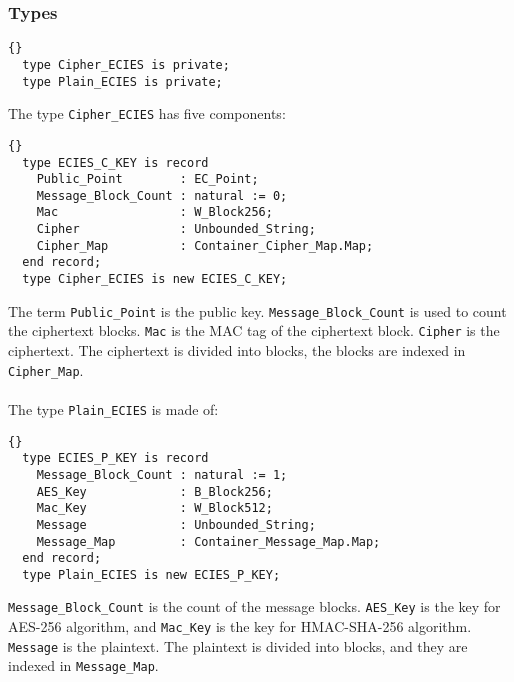 \subsubsection*{Types}
\begin{lstlisting}{}
  type Cipher_ECIES is private;
  type Plain_ECIES is private;
\end{lstlisting}
The type \texttt{Cipher\_ECIES} has five components:
\begin{lstlisting}{}
  type ECIES_C_KEY is record
    Public_Point        : EC_Point;
    Message_Block_Count : natural := 0;
    Mac                 : W_Block256;
    Cipher              : Unbounded_String;
    Cipher_Map          : Container_Cipher_Map.Map;
  end record;
  type Cipher_ECIES is new ECIES_C_KEY;
\end{lstlisting}
The term \texttt{Public\_Point} is the public key. \texttt{Message\_Block\_Count} is used to count the ciphertext blocks. \texttt{Mac} is the MAC tag of the ciphertext block. \texttt{Cipher} is the ciphertext. The ciphertext is divided into blocks, the blocks are indexed in \texttt{Cipher\_Map}.\\ \ \\
The type \texttt{Plain\_ECIES} is made of:
\begin{lstlisting}{}
  type ECIES_P_KEY is record
    Message_Block_Count : natural := 1;
    AES_Key             : B_Block256;
    Mac_Key             : W_Block512;
    Message             : Unbounded_String;
    Message_Map         : Container_Message_Map.Map;
  end record;
  type Plain_ECIES is new ECIES_P_KEY;
\end{lstlisting}
\texttt{Message\_Block\_Count} is the count of the message blocks. \texttt{AES\_Key} is the key for AES-256 algorithm, and \texttt{Mac\_Key} is the key for HMAC-SHA-256 algorithm. \texttt{Message} is the plaintext. The plaintext is divided into blocks, and they are indexed in \texttt{Message\_Map}.\\
